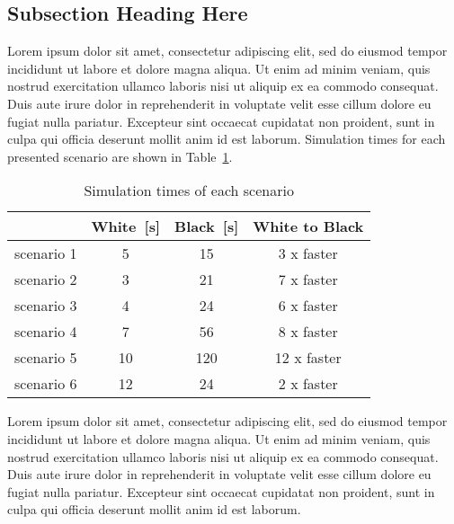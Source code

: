 \subsection{Subsection Heading Here}
Lorem ipsum dolor sit amet, consectetur adipiscing elit, sed do eiusmod tempor incididunt ut labore et dolore magna aliqua. Ut enim ad minim veniam, quis nostrud exercitation ullamco laboris nisi ut aliquip ex ea commodo consequat. Duis aute irure dolor in reprehenderit in voluptate velit esse cillum dolore eu fugiat nulla pariatur. Excepteur sint occaecat cupidatat non proident, sunt in culpa qui officia deserunt mollit anim id est laborum. Simulation times for each presented scenario are shown in Table~\ref{table_two}.

\begin{table}[h]
	\renewcommand{\arraystretch}{1.3}
	\caption{Simulation times of each scenario}
	\label{table_two}
	\centering
	\begin{tabular}{l|c|c|c}
		\hline\hline
		& White~[s] & Black~[s] & White to Black\\
		\hline\hline
		scenario 1 & 5 & 15 & 3 x faster\\
		\hline
		scenario 2 & 3 & 21 & 7 x faster\\
		\hline
		scenario 3 & 4 & 24 & 6 x faster\\
		\hline
		scenario 4 & 7 & 56 & 8 x faster\\
		\hline
		scenario 5 & 10 & 120 & 12 x faster\\
		\hline
		scenario 6 & 12 & 24 & 2 x faster\\
		\hline\hline
	\end{tabular}
\end{table}

Lorem ipsum dolor sit amet, consectetur adipiscing elit, sed do eiusmod tempor incididunt ut labore et dolore magna aliqua. Ut enim ad minim veniam, quis nostrud exercitation ullamco laboris nisi ut aliquip ex ea commodo consequat. Duis aute irure dolor in reprehenderit in voluptate velit esse cillum dolore eu fugiat nulla pariatur. Excepteur sint occaecat cupidatat non proident, sunt in culpa qui officia deserunt mollit anim id est laborum.









